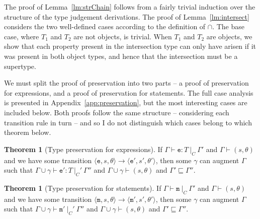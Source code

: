 \documentclass[12pt,a4paper,twoside,openright]{report}
\theoremstyle{definition}
\theoremstyle{dotless}
\newtheorem{theorem}[definition]{Theorem}
\newcommand{\transition}[6]{\langle{}\mathtt{#1},#2,#3\rangle{}\rightarrow{}\langle{}\mathtt{#4},#5,#6\rangle}
\begin{document}
The proof of Lemma~\ref{lm:strChain} follows from a fairly trivial induction
over the structure of the type judgement derivations. The proof of
Lemma~\ref{lm:intersect} considers the two well-defined cases according to the
definition of $\cap$. The base case, where $T_1$ and $T_2$ are not objects, is
trivial. When $T_1$ and $T_2$ are objects, we show that each property present
in the intersection type can only have arisen if it was present in both object
types, and hence that the intersection must be a supertype.

We must split the proof of preservation into two parts -- a proof of
preservation for expressions, and a proof of preservation for statements. The
full case analysis is presented in Appendix~\ref{app:preservation}, but the
most interesting cases are included below. Both proofs follow the same
structure -- considering each transition rule in turn -- and so I do not
distinguish which cases belong to which theorem below.

\begin{theorem}[Type preservation for expressions]\label{expPreservation}
  If $\Gamma\vdash \mathtt{e}:T\ |_C\ \Gamma'$ and $\Gamma\vdash(s, \theta)$ and we have some
  transition $\transition{e}{s}{\theta}{e'}{s'}{\theta'}$, then some $\gamma$ can augment $\Gamma$ such that
  $\Gamma\!\cup\!\gamma\vdash\mathtt{e'}:T\ |_C'\ \Gamma''$ and $\Gamma\!\cup\!\gamma\vdash(s,\theta)$ and
  $\Gamma'\sqsubseteq\Gamma''$.
\end{theorem}
\begin{theorem}[Type preservation for statements]\label{mPreservation}
  If $\Gamma\vdash \mathtt{m}\ |_C\ \Gamma'$ and $\Gamma\vdash(s, \theta)$ and we have some
  transition $\transition{m}{s}{\theta}{m'}{s'}{\theta'}$, then some $\gamma$ can augment $\Gamma$ such that
  $\Gamma\!\cup\!\gamma\vdash\mathtt{m'}\ |_C'\ \Gamma''$ and $\Gamma\!\cup\!\gamma\vdash(s,\theta)$ and 
  $\Gamma'\sqsubseteq\Gamma''$.
\end{theorem}
\end{document}
